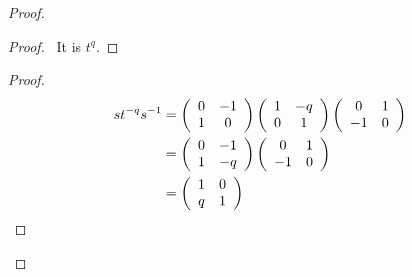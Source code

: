 \begin{proof}
\pf
{}
\begin{proof}
	\pf\ It is $t^q$.
\end{proof}
\begin{proof}
\pf
\begin{align*}
st^{-q}{s}^{-1} & = \left( \begin{array}{cc}
0 & -1 \\
1 & 0
\end{array} \right)
\left( \begin{array}{cc}
1 & -q \\ 0 & 1
\end{array} \right)
\left( \begin{array}{cc}
0 & 1 \\
-1 & 0
\end{array} \right) \\
& = \left( \begin{array}{cc}
0 & -1 \\
1 & -q
\end{array} \right)
\left( \begin{array}{cc}
0 & 1 \\
-1 & 0
\end{array} \right) \\
& = \left( \begin{array}{cc}
1 & 0 \\
q & 1
\end{array} \right)
\end{align*}
\end{proof}

\end{proof}
